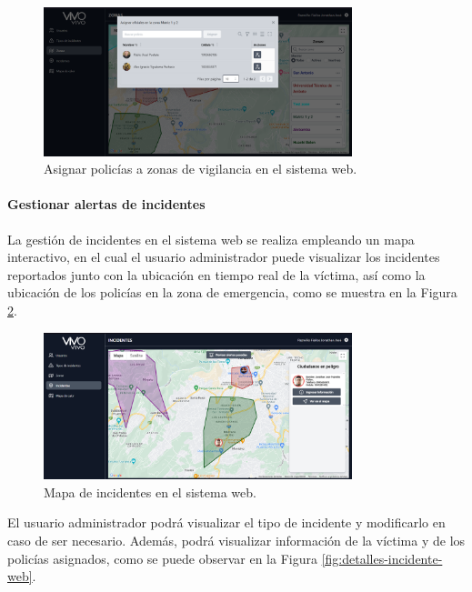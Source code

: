 \begin{figure}[H]
    \centering
    \includegraphics[width=0.8\textwidth]{chapters/III-resultados-y-discusion/resources/images/asignar-policias-zona-vigilancia-web.png}
    \caption{Asignar policías a zonas de vigilancia en el sistema web.}
    \label{fig:asignar-policias-zona-vigilancia-web}
\end{figure}

\paragraph{Gestionar alertas de incidentes}
La gestión de incidentes en el sistema web se realiza empleando un mapa interactivo, en el cual el usuario administrador puede visualizar
los incidentes reportados junto con la ubicación en tiempo real de la víctima, así como la ubicación de los policías en la zona de emergencia,
como se muestra en la Figura \ref{fig:mapa-incidentes-web}.

\begin{figure}[H]
    \centering
    \includegraphics[width=0.8\textwidth]{chapters/III-resultados-y-discusion/resources/images/mapa-incidentes-web.png}
    \caption{Mapa de incidentes en el sistema web.}
    \label{fig:mapa-incidentes-web}
\end{figure}

El usuario administrador podrá visualizar el tipo de incidente y modificarlo en caso de ser necesario. Además, podrá
visualizar información de la víctima y de los policías asignados, como se puede observar en la Figura \ref{fig:detalles-incidente-web}.

